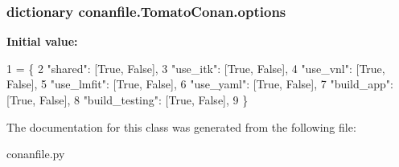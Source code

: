 \subsubsection[{\texorpdfstring{options}{options}}]{\setlength{\rightskip}{0pt plus 5cm}dictionary conanfile.\+Tomato\+Conan.\+options\hspace{0.3cm}{\ttfamily [static]}}\hypertarget{classconanfile_1_1_tomato_conan_adcb0f901242c4b6bf4bc216596cb077d}{}\label{classconanfile_1_1_tomato_conan_adcb0f901242c4b6bf4bc216596cb077d}
{\bfseries Initial value\+:}
\begin{DoxyCode}
1 = \{
2         \textcolor{stringliteral}{"shared"}: [\textcolor{keyword}{True}, \textcolor{keyword}{False}],
3         \textcolor{stringliteral}{"use\_itk"}: [\textcolor{keyword}{True}, \textcolor{keyword}{False}],
4         \textcolor{stringliteral}{"use\_vnl"}: [\textcolor{keyword}{True}, \textcolor{keyword}{False}],
5         \textcolor{stringliteral}{"use\_lmfit"}: [\textcolor{keyword}{True}, \textcolor{keyword}{False}],
6         \textcolor{stringliteral}{"use\_yaml"}: [\textcolor{keyword}{True}, \textcolor{keyword}{False}],
7         \textcolor{stringliteral}{"build\_app"}: [\textcolor{keyword}{True}, \textcolor{keyword}{False}],
8         \textcolor{stringliteral}{"build\_testing"}: [\textcolor{keyword}{True}, \textcolor{keyword}{False}],
9     \}
\end{DoxyCode}


The documentation for this class was generated from the following file\+:\begin{DoxyCompactItemize}
\item 
conanfile.\+py\end{DoxyCompactItemize}
